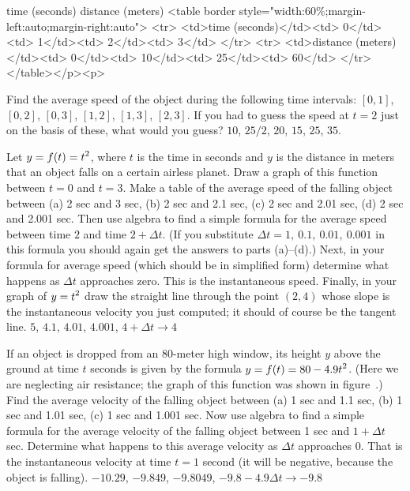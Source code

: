\texonly
\bsk
\begintable
\hfill time (seconds)\elt
\hfill distance (meters)\endtable
\endtexonly
\htmlonly
<table border style="width:60\%;margin-left:auto;margin-right:auto">
<tr>
<td>time (seconds)</td><td> 0</td><td> 1</td><td> 2</td><td> 3</td>
</tr>
<tr>
<td>distance (meters)</td><td> 0</td><td> 10</td><td> 25</td><td> 60</td>
</tr></table></p><p>
\endhtmlonly
\item{}Find the average speed of the object during the following time
intervals: $[0,1]$, $[0,2]$, $[0,3]$,
$[1,2]$, $[1,3]$, $[2,3]$. If you had to guess the speed at
$t=2$ just on the basis of these, what would you guess?
\answer $10$, $25/2$, $20$, $15$, $25$, $35$.
\endanswer
\endexercise

\exercise
Let $\displaystyle y=f(t)=t^2$, where $t$ is the time in seconds and $y$ is the distance
in meters that an object falls on a certain airless planet.  Draw a graph
of this function between $t=0$ and $t=3$.  Make a table of the average
speed of the falling object between (a) 2 sec and 3 sec, (b) 2 sec and
2.1 sec, (c) 2 sec and 2.01 sec, (d) 2 sec and 2.001 sec.  Then use algebra
to find a simple formula for the average speed between time $2$ and time
$2+
\Delta t$.  (If you substitute $\Delta t=1,\>0.1,\>0.01,\>0.001$ in this
formula you should again get the answers to parts (a)--(d).)  Next, in your
formula for average speed (which should be in simplified form) determine
what happens as $\Delta t$ approaches zero.  This is the instantaneous
speed.  Finally, in your graph of $\displaystyle y=t^2$ draw the straight line
through the point $(2,4)$ whose slope is the instantaneous velocity you
just computed; it should of course be the tangent line.
\answer $5$, $4.1$, $4.01$, $4.001$, $4+\Delta t\rightarrow 4$
\endanswer
\endexercise

\exercise
If an object is dropped from an 80-meter high window, its height $y$ above
the ground at time $t$ seconds is given by the formula $\displaystyle y=f(t)=80-4.9t^2$.
(Here we are neglecting air resistance; the graph of this function was
shown in figure~.)  Find the average velocity of
the falling object between (a) 1 sec and 1.1 sec, (b) 1 sec and 1.01 sec,
(c) 1 sec and 1.001 sec.  Now use algebra to find a simple formula for the
average velocity of the falling object between 1 sec and $1+\Delta t$ sec.
Determine what happens to this average velocity as $\Delta t$ approaches 0.
That is the instantaneous velocity at time $t=1$ second (it will be negative,
because the object is falling).
\answer $-10.29$, $-9.849$, $-9.8049$, \hfill\break
$-9.8-4.9\Delta t\rightarrow -9.8$
\endanswer
\endexercise

\endexercises
